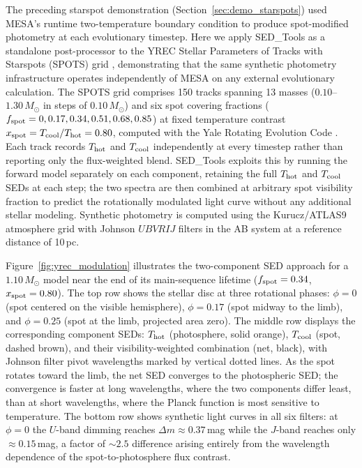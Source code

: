 \documentclass[linenumbers,apj,twocolumn, floatfix]{aastex701}
\begin{document}
The preceding starspot demonstration (Section~\ref{sec:demo_starspots}) used MESA's runtime two-temperature boundary condition to produce spot-modified photometry at each evolutionary timestep.
Here we apply SED\_Tools as a standalone post-processor to the YREC Stellar Parameters of Tracks with Starspots (SPOTS) grid \citep{Somers2020}, demonstrating that the same synthetic photometry infrastructure operates independently of MESA on any external evolutionary calculation.
The SPOTS grid comprises 150 tracks spanning 13 masses ($0.10$--$1.30\,M_\odot$ in steps of $0.10\,M_\odot$) and six spot covering fractions ($f_{\rm spot} = 0, 0.17, 0.34, 0.51, 0.68, 0.85$) at fixed temperature contrast $x_{\rm spot} = T_{\rm cool}/T_{\rm hot} = 0.80$, computed with the Yale Rotating Evolution Code \citep{vanSaders2013}.
Each track records $T_{\rm hot}$ and $T_{\rm cool}$ independently at every timestep rather than reporting only the flux-weighted blend.
SED\_Tools exploits this by running the forward model separately on each component, retaining the full $T_{\rm hot}$ and $T_{\rm cool}$ SEDs at each step; the two spectra are then combined at arbitrary spot visibility fraction to predict the rotationally modulated light curve without any additional stellar modeling.
Synthetic photometry is computed using the Kurucz/ATLAS9 atmosphere grid with Johnson $UBVRIJ$ filters in the AB system at a reference distance of 10\,pc.

Figure~\ref{fig:yrec_modulation} illustrates the two-component SED approach for a $1.10\,M_\odot$ model near the end of its main-sequence lifetime ($f_{\rm spot} = 0.34$, $x_{\rm spot} = 0.80$).
The top row shows the stellar disc at three rotational phases: $\phi = 0$ (spot centered on the visible hemisphere), $\phi = 0.17$ (spot midway to the limb), and $\phi = 0.25$ (spot at the limb, projected area zero).
The middle row displays the corresponding component SEDs: $T_{\rm hot}$ (photosphere, solid orange), $T_{\rm cool}$ (spot, dashed brown), and their visibility-weighted combination (net, black), with Johnson filter pivot wavelengths marked by vertical dotted lines.
As the spot rotates toward the limb, the net SED converges to the photospheric SED; the convergence is faster at long wavelengths, where the two components differ least, than at short wavelengths, where the Planck function is most sensitive to temperature.
The bottom row shows synthetic light curves in all six filters: at $\phi = 0$ the $U$-band dimming reaches $\Delta m \approx 0.37$\,mag while the $J$-band reaches only $\approx 0.15$\,mag, a factor of $\sim 2.5$ difference arising entirely from the wavelength dependence of the spot-to-photosphere flux contrast.
\end{document}
